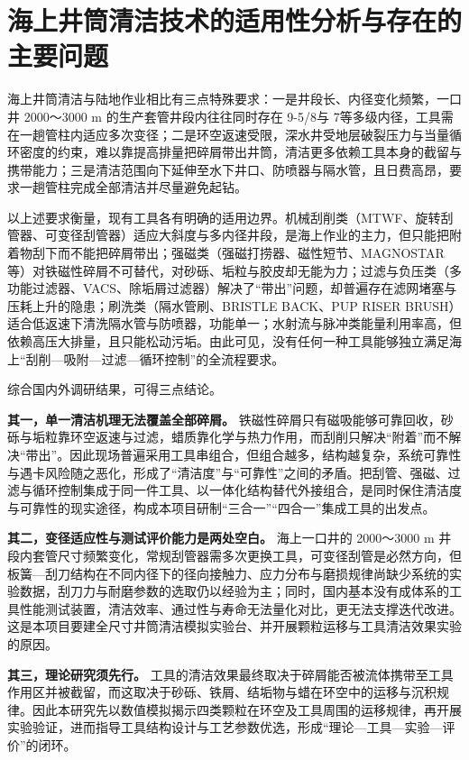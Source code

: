 \section{海上井筒清洁技术的适用性分析与存在的主要问题}

海上井筒清洁与陆地作业相比有三点特殊要求：一是井段长、内径变化频繁，一口井 2000～3000 m 的生产套管井段内往往同时存在 9-5/8\inch 与 7\inch 等多级内径，工具需在一趟管柱内适应多次变径；二是环空返速受限，深水井受地层破裂压力与当量循环密度的约束，难以靠提高排量把碎屑带出井筒，清洁更多依赖工具本身的截留与携带能力；三是清洁范围向下延伸至水下井口、防喷器与隔水管，且日费高昂，要求一趟管柱完成全部清洁并尽量避免起钻。

以上述要求衡量，现有工具各有明确的适用边界。机械刮削类（MTWF、旋转刮管器、可变径刮管器）适应大斜度与多内径井段，是海上作业的主力，但只能把附着物刮下而不能把碎屑带出；强磁类（强磁打捞器、磁性短节、MAGNOSTAR 等）对铁磁性碎屑不可替代，对砂砾、垢粒与胶皮却无能为力；过滤与负压类（多功能过滤器、VACS、除垢屑过滤器）解决了“带出”问题，却普遍存在滤网堵塞与压耗上升的隐患；刷洗类（隔水管刷、BRISTLE BACK、PUP RISER BRUSH）适合低返速下清洗隔水管与防喷器，功能单一；水射流与脉冲类能量利用率高，但依赖高压大排量，且只能松动污垢。由此可见，没有任何一种工具能够独立满足海上“刮削—吸附—过滤—循环控制”的全流程要求。

综合国内外调研结果，可得三点结论。

\textbf{其一，单一清洁机理无法覆盖全部碎屑。} 铁磁性碎屑只有磁吸能够可靠回收，砂砾与垢粒靠环空返速与过滤，蜡质靠化学与热力作用，而刮削只解决“附着”而不解决“带出”。因此现场普遍采用工具串组合，但组合越多，结构越复杂，系统可靠性与遇卡风险随之恶化，形成了“清洁度”与“可靠性”之间的矛盾。把刮管、强磁、过滤与循环控制集成于同一件工具、以一体化结构替代外接组合，是同时保住清洁度与可靠性的现实途径，构成本项目研制“三合一”“四合一”集成工具的出发点。

\textbf{其二，变径适应性与测试评价能力是两处空白。} 海上一口井的 2000～3000 m 井段内套管尺寸频繁变化，常规刮管器需多次更换工具，可变径刮管是必然方向，但板簧—刮刀结构在不同内径下的径向接触力、应力分布与磨损规律尚缺少系统的实验数据，刮刀力与耐磨参数的选取仍以经验为主；同时，国内基本没有成体系的工具性能测试装置，清洁效率、通过性与寿命无法量化对比，更无法支撑迭代改进。这是本项目要建全尺寸井筒清洁模拟实验台、并开展颗粒运移与工具清洁效果实验的原因。

\textbf{其三，理论研究须先行。} 工具的清洁效果最终取决于碎屑能否被流体携带至工具作用区并被截留，而这取决于砂砾、铁屑、结垢物与蜡在环空中的运移与沉积规律。因此本研究先以数值模拟揭示四类颗粒在环空及工具周围的运移规律，再开展实验验证，进而指导工具结构设计与工艺参数优选，形成“理论—工具—实验—评价”的闭环。


